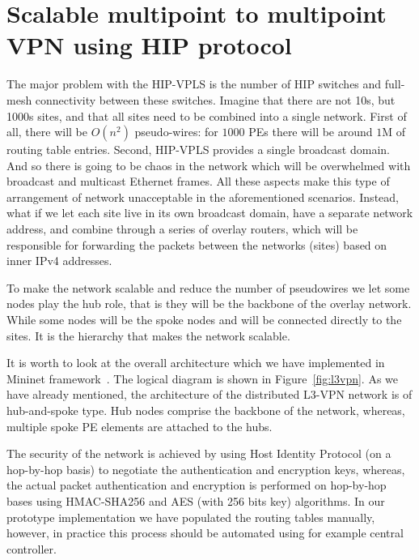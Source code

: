 \section{Scalable multipoint to multipoint VPN using HIP protocol}

The major problem with the HIP-VPLS is the number of HIP switches and
full-mesh connectivity between these switches. Imagine that there are 
not 10s, but 1000s sites, and that all sites need to be 
combined into a single network. First of all, there will be 
$O(n^2)$ pseudo-wires: for $1000$ PEs there will be  
around $1$M of routing table entries. Second, HIP-VPLS provides 
a single broadcast domain. And so there is going to be 
chaos in the network which will be overwhelmed with broadcast
and multicast Ethernet frames. All these aspects make this type of
arrangement of network unacceptable in the aforementioned scenarios.
Instead, what if we let each site live in its own broadcast
domain, \ie have a separate network address, and combine through 
a series of overlay routers, which will be responsible for 
forwarding the packets between the networks (sites) based on 
inner IPv4 addresses. 

To make the network scalable and reduce the number of pseudowires
we let some nodes play the hub role, that is they will be the backbone 
of the overlay network. While some nodes will be the spoke nodes
and will be connected directly to the sites. It is the hierarchy 
that makes the network scalable. 

It is worth to look at the overall architecture which we have implemented in
Mininet framework~\cite{hip-l3vpn}. The logical diagram is shown in Figure~\ref{fig:l3vpn}. 
As we have already mentioned, the architecture of the distributed 
L3-VPN network is of hub-and-spoke type. Hub nodes comprise the backbone of the network, whereas,
multiple spoke PE elements are attached to the hubs. 

The security of the network is achieved by using Host Identity Protocol (on a hop-by-hop basis) to negotiate
the authentication and encryption keys, whereas, the actual packet authentication
and encryption is performed on hop-by-hop bases using HMAC-SHA256
and AES (with 256 bits key) algorithms. In our prototype implementation we 
have populated the routing tables manually, however, in practice this 
process should be automated using for example central controller. 

